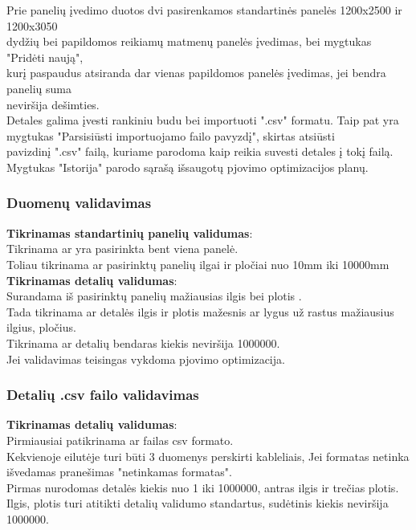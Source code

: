 \documentclass[a4paper,12pt]{article}
\begin{document}
Prie panelių įvedimo duotos dvi pasirenkamos standartinės panelės 1200x2500 ir 1200x3050\\ 
dydžių bei papildomos reikiamų matmenų panelės įvedimas, bei mygtukas "Pridėti naują", \\
kurį paspaudus atsiranda dar vienas papildomos panelės įvedimas, jei bendra panelių suma \\
neviršija dešimties. \\
Detales galima įvesti rankiniu budu bei importuoti ".csv" formatu. 
Taip pat yra mygtukas "Parsisiūsti importuojamo failo pavyzdį", skirtas atsiūsti \\
pavizdinį ".csv" failą, kuriame parodoma kaip reikia suvesti detales į tokį failą. \\
Mygtukas "Istorija" parodo sąrašą išsaugotų pjovimo optimizacijos planų.

\subsubsection{Duomenų validavimas}
\textbf{Tikrinamas standartinių panelių validumas}:\\
	Tikrinama ar yra pasirinkta bent viena panelė. \\
	Toliau tikrinama ar pasirinktų panelių ilgai ir pločiai nuo 10mm iki 10000mm \\


\textbf{Tikrinamas detalių validumas}:\\
	Surandama iš pasirinktų panelių mažiausias ilgis bei plotis .\\
	Tada tikrinama ar detalės ilgis ir plotis mažesnis ar lygus už rastus mažiausius ilgius, pločius.\\
	Tikrinama ar detalių bendaras kiekis neviršija 1000000. \\

Jei validavimas teisingas vykdoma pjovimo optimizacija.

\subsubsection{Detalių .csv failo validavimas}
\textbf{Tikrinamas detalių validumas}:\\
	Pirmiausiai patikrinama ar failas csv formato. \\
	Kekvienoje eilutėje turi būti 3 duomenys perskirti kableliais, Jei formatas netinka 
	išvedamas pranešimas "netinkamas formatas". \\
	Pirmas nurodomas detalės kiekis nuo 1 iki 1000000, antras ilgis ir trečias plotis. \\
	Ilgis, plotis turi atitikti detalių validumo standartus, sudėtinis kiekis neviršija 1000000.\\
	
\end{document}
